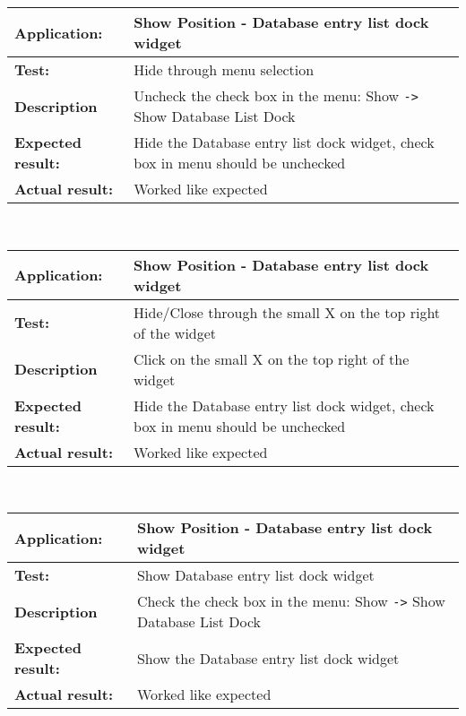    \begin{tabular}{|p{3.5cm}|p{10.5cm}|}
    \hline
     \textbf{Application:}	& Show Position - Database entry list dock widget\\
    \hline
     \textbf{Test:}		& Hide through menu selection\\
    \hline
     \textbf{Description}	& Uncheck the check box in the menu: Show \verb=->= Show Database List Dock\\
    \hline
     \textbf{Expected result:}	& Hide the Database entry list dock widget, check box in menu should be unchecked\\
    \hline
     \textbf{Actual result:}	& Worked like expected\\
    \hline
   \end{tabular}\\
   \begin{tabular}{|p{3.5cm}|p{10.5cm}|}
    \hline
     \textbf{Application:}	& Show Position - Database entry list dock widget\\
    \hline
     \textbf{Test:}		& Hide/Close through the small X on the top right of the widget\\
    \hline
     \textbf{Description}	& Click on the small X on the top right of the widget\\
    \hline
     \textbf{Expected result:}	& Hide the Database entry list dock widget, check box in menu should be unchecked\\
    \hline
     \textbf{Actual result:}	& Worked like expected\\
    \hline
   \end{tabular}\\
   \begin{tabular}{|p{3.5cm}|p{10.5cm}|}
    \hline
     \textbf{Application:}	& Show Position - Database entry list dock widget\\
    \hline
     \textbf{Test:}		& Show Database entry list dock widget\\
    \hline
     \textbf{Description}	& Check the check box in the menu: Show \verb=->= Show Database List Dock\\
    \hline
     \textbf{Expected result:}	& Show the Database entry list dock widget\\
    \hline
     \textbf{Actual result:}	& Worked like expected\\
    \hline
   \end{tabular}\\
